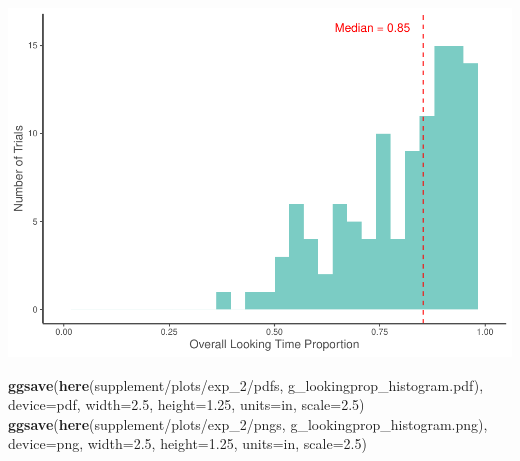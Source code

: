 \documentclass[
  doc,floatsintext]{apa6}
\newenvironment{Shaded}{\begin{snugshade}}{\end{snugshade}}
\newcommand{\AttributeTok}[1]{\textcolor[rgb]{0.13,0.29,0.53}{#1}}
\newcommand{\FloatTok}[1]{\textcolor[rgb]{0.00,0.00,0.81}{#1}}
\newcommand{\FunctionTok}[1]{\textcolor[rgb]{0.13,0.29,0.53}{\textbf{#1}}}
\newcommand{\NormalTok}[1]{#1}
\newcommand{\StringTok}[1]{\textcolor[rgb]{0.31,0.60,0.02}{#1}}
\begin{document}
\includegraphics{revised_ms_analyses_files/figure-latex/r2-g-durs-lookingprop-1.pdf}

\begin{Shaded}
\begin{Highlighting}[]
\FunctionTok{ggsave}\NormalTok{(}\FunctionTok{here}\NormalTok{(}\StringTok{\textquotesingle{}supplement/plots/exp\_2/pdfs\textquotesingle{}}\NormalTok{, }\StringTok{\textquotesingle{}g\_lookingprop\_histogram.pdf\textquotesingle{}}\NormalTok{), }
       \AttributeTok{device=}\StringTok{\textquotesingle{}pdf\textquotesingle{}}\NormalTok{, }\AttributeTok{width=}\FloatTok{2.5}\NormalTok{, }\AttributeTok{height=}\FloatTok{1.25}\NormalTok{, }\AttributeTok{units=}\StringTok{\textquotesingle{}in\textquotesingle{}}\NormalTok{, }\AttributeTok{scale=}\FloatTok{2.5}\NormalTok{)}
\FunctionTok{ggsave}\NormalTok{(}\FunctionTok{here}\NormalTok{(}\StringTok{\textquotesingle{}supplement/plots/exp\_2/pngs\textquotesingle{}}\NormalTok{, }\StringTok{\textquotesingle{}g\_lookingprop\_histogram.png\textquotesingle{}}\NormalTok{),}
       \AttributeTok{device=}\StringTok{\textquotesingle{}png\textquotesingle{}}\NormalTok{, }\AttributeTok{width=}\FloatTok{2.5}\NormalTok{, }\AttributeTok{height=}\FloatTok{1.25}\NormalTok{, }\AttributeTok{units=}\StringTok{\textquotesingle{}in\textquotesingle{}}\NormalTok{, }\AttributeTok{scale=}\FloatTok{2.5}\NormalTok{)}
\end{Highlighting}
\end{Shaded}
\end{document}

